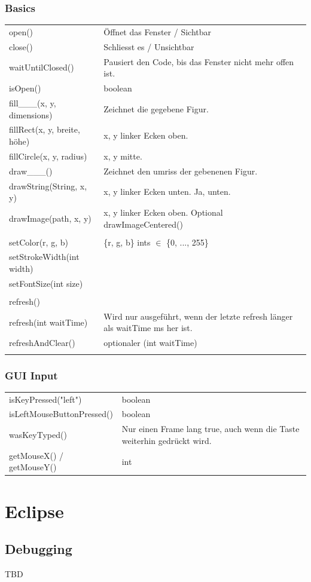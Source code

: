 \documentclass[12pt,a4paper]{article}
\begin{document}
\subsubsection*{Basics}
\begin{tabularx}{\linewidth}{l X}
open() & Öffnet das Fenster / Sichtbar\\
close() & Schliesst es / Unsichtbar\\
waitUntilClosed() & Pausiert den Code, bis das Fenster nicht mehr offen ist.\\
isOpen() & boolean\\
fill\_\_\_(x, y, dimensions) & Zeichnet die gegebene Figur.\\
fillRect(x, y, breite, höhe) & x, y linker Ecken oben.\\
fillCircle(x, y, radius) & x, y mitte.\\
draw\_\_\_() & Zeichnet den umriss der gebenenen Figur.\\
drawString(String, x, y) & x, y linker Ecken unten. Ja, unten.\\
drawImage(path, x, y) & x, y linker Ecken oben. Optional drawImageCentered()\\\\
setColor(r, g, b) & \{r, g, b\} ints $\in$ \{0, ..., 255\}\\
setStrokeWidth(int width)\\
setFontSize(int size)\\\\
refresh()\\
refresh(int waitTime) & Wird nur ausgeführt, wenn der letzte refresh länger als waitTime ms her ist.\\
refreshAndClear() & optionaler (int waitTime)\\\\
\end{tabularx}
\subsubsection*{GUI Input}
\begin{tabularx}{\linewidth}{l X}
isKeyPressed("left") & boolean\\
isLeftMouseButtonPressed() & boolean\\
wasKeyTyped() & Nur einen Frame lang true, auch wenn die Taste weiterhin gedrückt wird.\\
getMouseX() / getMouseY() & int
\end{tabularx}
\newpage
\section{Eclipse}
\subsection{Debugging}
TBD %
\end{document}
